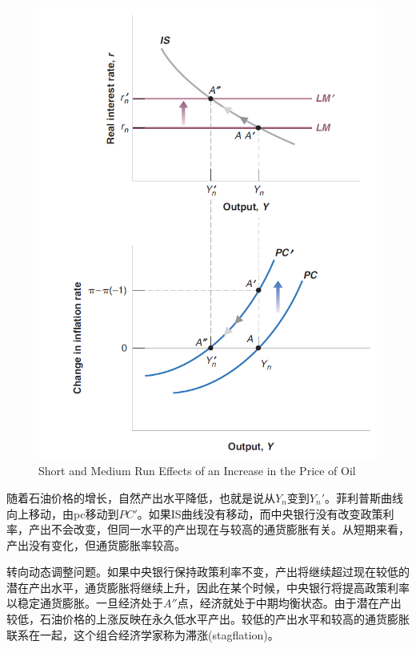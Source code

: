 \documentclass{article}
\begin{document}
\begin{figure}[H] %
	\centering %
	\includegraphics[width=1\textwidth]{9_6} %
	\caption{Short and Medium Run
		Effects of an Increase in
		the Price of Oil} %
	\label{Fig.main7} %
\end{figure}

随着石油价格的增长，自然产出水平降低，也就是说从$ Y_n $变到$ Y_n' $。菲利普斯曲线向上移动，由pc移动到$ PC' $。如果IS曲线没有移动，而中央银行没有改变政策利率，产出不会改变，但同一水平的产出现在与较高的通货膨胀有关。从短期来看，产出没有变化，但通货膨胀率较高。

转向动态调整问题。如果中央银行保持政策利率不变，产出将继续超过现在较低的潜在产出水平，通货膨胀将继续上升，因此在某个时候，中央银行将提高政策利率以稳定通货膨胀。一旦经济处于$ A'' $点，经济就处于中期均衡状态。由于潜在产出较低，石油价格的上涨反映在永久低水平产出。较低的产出水平和较高的通货膨胀联系在一起，这个组合经济学家称为滞涨(stagflation)。
\end{document}
